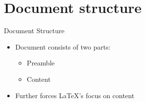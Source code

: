 \documentclass{beamer}
\begin{document}


\section{Document structure}
\begin{frame}{Document Structure}
    \begin{itemize}
        \item Document consists of two parts:
            \begin{itemize}
                \item Preamble
                \item Content
            \end{itemize}
        \item Further forces \LaTeX{}'s focus on content
    \end{itemize}
\end{frame}
\end{document}
